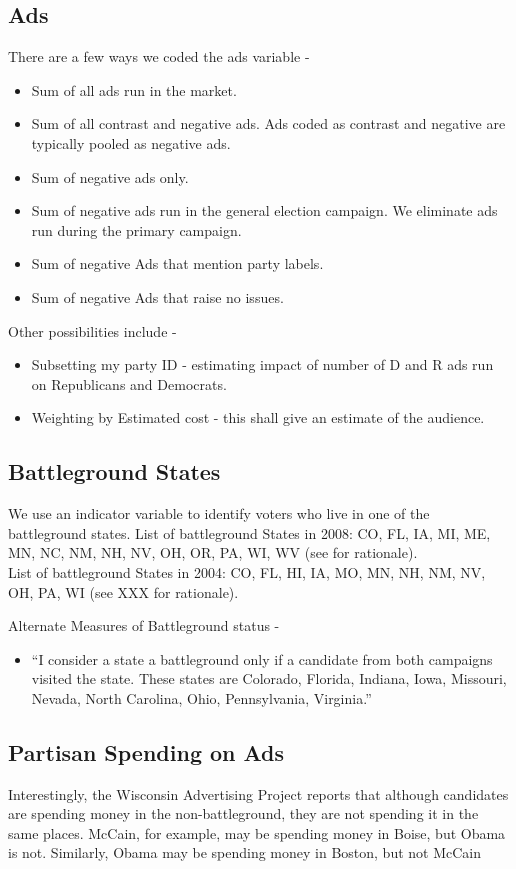 \documentclass[doc,fignum,noapacite]{apa}
\begin{document}
\subsection{Ads}
There are a few ways we coded the ads variable - 
\begin{itemize}
\item Sum of all ads run in the market.
\item Sum of all contrast and negative ads. Ads coded as contrast and negative are typically pooled as negative ads.
\item Sum of negative ads only. 
\item Sum of negative ads run in the general election campaign. We eliminate ads run during the primary campaign.
\item Sum of negative Ads that mention party labels.
\item Sum of negative Ads that raise no issues.
\end{itemize}
Other possibilities include - 
\begin{itemize}
\item Subsetting my party ID - estimating impact of number of D and R ads run on Republicans and Democrats.  
\item Weighting by Estimated cost - this shall give an estimate of the audience. 
\end{itemize}
\subsection{Battleground States} We use an indicator variable to identify voters who live in one of the battleground 
states. List of battleground States in 2008: CO, FL, IA, MI, ME, MN, NC, NM, NH, NV, OH, OR, PA, WI, WV (see \cite {Jackman2009b} 
for rationale).\\ 
List of battleground States in 2004: CO, FL, HI, IA, MO, MN, NH, NM, NV, OH, PA, WI (see XXX for rationale). 

Alternate Measures of Battleground status - 
\begin{itemize}
\item ``I consider a state a battleground only if a candidate from both campaigns visited the state. These states are
Colorado, Florida, Indiana, Iowa, Missouri, Nevada, North Carolina, Ohio, Pennsylvania, Virginia.'' \cite {Mcdonald2009}
\end{itemize}

\subsection{Partisan Spending on Ads} Interestingly, the Wisconsin Advertising Project reports that although 
candidates are spending money in the non-battleground, they are not spending it in the same places. McCain, for
example, may be spending money in Boise, but Obama is not. Similarly, Obama may be spending money in Boston, but not 
McCain
\end{document}
